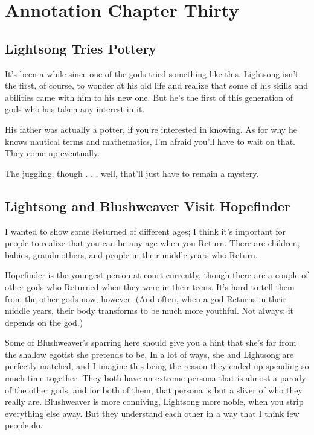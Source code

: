 \section{Annotation Chapter Thirty}

\subsection*{Lightsong Tries Pottery}

It’s been a while since one of the gods tried something like this. Lightsong isn’t the first, of course, to wonder at his old life and realize that some of his skills and abilities came with him to his new one. But he’s the first of this generation of gods who has taken any interest in it.

His father was actually a potter, if you’re interested in knowing. As for why he knows nautical terms and mathematics, I’m afraid you’ll have to wait on that. They come up eventually.

The juggling, though . . . well, that’ll just have to remain a mystery.

\subsection*{Lightsong and Blushweaver Visit Hopefinder}

I wanted to show some Returned of different ages; I think it’s important for people to realize that you can be any age when you Return. There are children, babies, grandmothers, and people in their middle years who Return.

Hopefinder is the youngest person at court currently, though there are a couple of other gods who Returned when they were in their teens. It’s hard to tell them from the other gods now, however. (And often, when a god Returns in their middle years, their body transforms to be much more youthful. Not always; it depends on the god.)

Some of Blushweaver’s sparring here should give you a hint that she’s far from the shallow egotist she pretends to be. In a lot of ways, she and Lightsong are perfectly matched, and I imagine this being the reason they ended up spending so much time together. They both have an extreme persona that is almost a parody of the other gods, and for both of them, that persona is but a sliver of who they really are. Blushweaver is more conniving, Lightsong more noble, when you strip everything else away. But they understand each other in a way that I think few people do.



